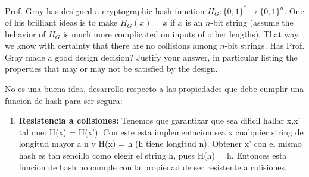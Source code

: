 \documentclass[12pt,addpoints,answers]{exam}
\begin{document}
\begin{questions}

\newpage

\question[10] Prof. Gray has designed a cryptographic hash function $H_G : \{0, 1\}^\ast \rightarrow \{0, 1\}^n$. One of his brilliant ideas is to make $H_G(x) = x$ if $x$ is an $n$-bit string (assume the behavior of $H_G$ is much more complicated on inputs of other lengths). That way, we know with certainty that there are no collisions among $n$-bit strings. Has Prof. Gray made a good design decision? Justify your answer, in particular listing the properties that may or may not be satisfied by the design.

\begin{solution} 

    No es una buena idea, desarrollo respecto a las propiedades que debe cumplir una funcion de hash para ser segura:

    \begin{enumerate}
        \item \textbf{Resistencia a colisiones:} 
        Tenemos que garantizar que sea dificil hallar x,x' tal que: H(x) = H(x').
        Con este esta implementacion sea x cualquier string de longitud mayor a n y H(x) = h (h tiene longitud n). Obtener
        x' con el mismo hash es tan sencillo como elegir el string h, pues H(h) = h. Entonces esta funcion de hash no cumple
        con la propiedad de ser resistente a colisiones.


\end{enumerate}
\end{solution}
\end{questions}
\end{document}
